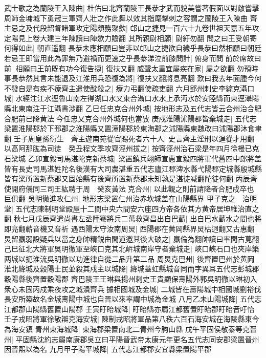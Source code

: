武士歌之為蘭陵王入陳曲|{
	杜佑曰北齊蘭陵王長㳟才武而貌美嘗著假面以對敵嘗擊周師金墉城下勇冠三軍齊人壯之作此舞以效其指麾擊刺之容謂之蘭陵王入陳曲}
齊主忌之及代段韶督諸軍攻定陽頗務聚歛|{
	邙山之捷見一百六十九卷世祖天嘉五年攻定陽見上卷大建三年陳讀曰陣歛力贍翻}
其所親尉相願|{
	尉紆勿翻}
問之曰王受朝寄何得如此|{
	朝直遥翻}
長恭未應相願曰豈非以邙山之捷欲自穢乎長恭曰然相願曰朝廷若忌王即當用此為罪無乃避禍而更速之乎長㳟涕泣前膝問計|{
	俯身而問前於席故曰前}
相願曰王前既有功今復告捷|{
	復扶又翻}
威聲太重宜屬疾在家|{
	屬之欲翻}
勿預時事長恭然其言未能退及江淮用兵恐復為將|{
	復扶又翻將息亮翻}
歎曰我去年面腫今何不發自是有疾不療齊主遣使酖殺之|{
	療力弔翻使疏吏翻}
六月郢州刺史李綜克灄口城|{
	水經注江水逕魯山南左得湖口水又東合灄口水水上承沔水於安陸縣而東逕灄陽縣北東南注于江灄書涉翻}
乙巳任忠克合州外城|{
	按地形志及五代志皆云合州治合肥合肥前已降黄法今任忠乂克合州外城何也當攷}
庚戍淮陽沭陽郡皆棄城走|{
	五代志梁置淮陽郡於下邳郡之淮陽縣又置潼陽郡於東海郡之沭陽縣東魏改曰沭陽郡沐食聿翻}
壬子周皇孫衍生　齊主遊南苑從官賜死者六十人|{
	史言齊主淫刑以逞從才用翻}
以高阿那肱為司徒　癸丑程文季攻齊涇州拔之|{
	按齊涇州治石梁是年四月徐槾已克石梁城}
乙卯宣毅司馬湛陀克新蔡城|{
	梁置鎮兵翊師宣惠宣毅四將軍代舊四中郎將盖皆有長史司馬湛姓陀名後漢有大司農湛重五代志廬江郡渒水縣弋陽郡定城縣殷城縣皆有梁所置新蔡郡又固始縣有後齊所置新蔡郡未知孰是湛徒减翻陀徒何翻}
丙辰齊使開府儀同三司王紘聘于周　癸亥黃法克合州|{
	以此觀之則前請降者合肥戍卒也巨俱翻}
吳明徹進攻仁州|{
	地形志梁置仁州治赤坎城盖在山陽縣界}
甲子克之　治明堂|{
	五代志陳制明堂殿屋十二間中央六間安六座四方帝各依其方黄帝居坤維治直之翻}
秋七月戊辰齊遣尚書左丞陸騫將兵二萬救齊昌出自巴蘄|{
	出自巴水蘄水之間也將即亮翻蘄音機又音祈}
遇西陽太守汝南周炅|{
	西陽郡在黄岡縣界炅枯迥翻又古惠翻}
炅留羸弱設疑兵以當之身帥精鋭由間道邀其後大破之|{
	羸倫為翻帥讀曰率間古莧翻}
己巳征北大將軍吳明徹軍至峽口克其北㟁城南岸守者棄城走|{
	峽口峽石口也夾岸築两城以扼淮流吳明徹以功進律自從二品升第二品}
周炅克巴州|{
	後齊置巴州於黄岡}
淮北絳城及穀陽士民並殺其戍主以城降|{
	絳城蓋虹縣城音同而字異耳五代志彭城郡穀陽縣後齊置穀陽郡}
齊巴陵王王琳與揚州刺史王貴顯保壽陽外郭吳明徹以琳初入衆心未固丙戍乘夜攻之城潰齊兵據相國城及金城|{
	二城皆在壽陽城中相國城劉裕伐長安所築故名金城夀陽中城也自晉以來率謂中城為金城}
八月乙未山陽城降|{
	五代志江都郡山陽縣舊置山陽郡}
壬寅盱眙城降|{
	盱眙縣亦屬江都舊置盱眙郡盱眙音吁怡}
壬子戎昭將軍徐敬辯克海安城|{
	陳制戎昭將軍品第八秩六百石海安城在海陵縣東今為海安鎮}
青州東海城降|{
	東海郡梁置南北二青州今朐山縣}
戊午平固侯敬泰等克晉州|{
	平固縣沈約志屬南康郡吳立曰平陽晉武帝太康元年更名五代志同安郡梁置晉州因晉熙以為名}
九月甲子陽平城降|{
	五代志江都郡安宜縣梁置陽平郡}
